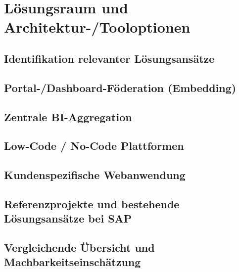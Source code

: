 \section{Lösungsraum und Architektur-/Tooloptionen}

\subsection{Identifikation relevanter Lösungsansätze}

\subsection{Portal-/Dashboard-Föderation (Embedding)}

\subsection{Zentrale BI-Aggregation}

\subsection{Low-Code / No-Code Plattformen}

\subsection{Kundenspezifische Webanwendung}

\subsection{Referenzprojekte und bestehende Lösungsansätze bei SAP}

\subsection{Vergleichende Übersicht und Machbarkeitseinschätzung}
